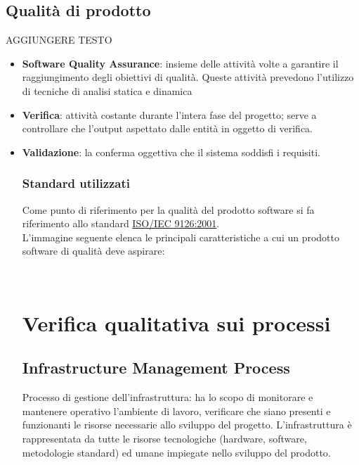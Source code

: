 \documentclass[a4paper,11pt]{article}
\begin{document}
\subsection{Qualità di prodotto}
AGGIUNGERE TESTO
\begin{itemize}
\item \textbf{Software Quality Assurance}: insieme delle attività volte a garantire il raggiungimento degli obiettivi di qualità. Queste attività prevedono l'utilizzo di tecniche di analisi statica e dinamica
\item \textbf{Verifica}: attività costante durante l'intera fase del progetto; serve a controllare che l'output aspettato dalle entità in oggetto di verifica.
\item \textbf{Validazione}: la conferma oggettiva che il sistema soddisfi i requisiti. 
\subsubsection{Standard utilizzati}
Come punto di riferimento per la qualità del prodotto software si fa riferimento allo standard \underline{ISO/IEC 9126:2001}.\\
L'immagine seguente elenca le principali caratteristiche a cui un prodotto software di qualità deve aspirare:\\
\vspace{6mm}
\noindent%
\begin{minipage}{\linewidth}%
\end{minipage}\\

\newpage
\section{Verifica qualitativa sui processi}

\subsection{Infrastructure Management Process}
Processo di gestione dell'infrastruttura: ha lo scopo di monitorare e mantenere operativo l'ambiente di lavoro, verificare che siano presenti e funzionanti le risorse necessarie allo sviluppo del progetto.
L'infrastruttura è rappresentata da tutte le risorse tecnologiche (hardware, software, metodologie standard) ed umane impiegate nello sviluppo del prodotto.


\end{itemize}
\end{document}

